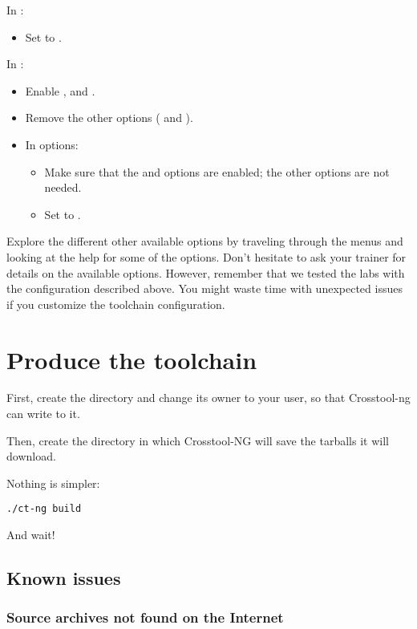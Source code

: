 In :
\begin{itemize}
\item Set  to .
\end{itemize}

In :
\begin{itemize}
\item Enable ,  and .
\item Remove the other options ( and ).
\item In  options:
  \begin{itemize}
  \item Make sure that the  and 
	options are enabled; the other options are not needed.
  \item Set  to .
  \end{itemize}
\end{itemize}

Explore the different other available options by traveling through the
menus and looking at the help for some of the options. Don't hesitate
to ask your trainer for details on the available options. However,
remember that we tested the labs with the configuration described
above. You might waste time with unexpected issues if you customize the
toolchain configuration.

\section{Produce the toolchain}

First, create the directory  and change its
owner to your user, so that Crosstool-ng can write to it.

Then, create the directory  in which Crosstool-NG
will save the tarballs it will download.

Nothing is simpler:

\begin{verbatim}
./ct-ng build
\end{verbatim}

And wait!

\subsection{Known issues}

\subsubsection{Source archives not found on the Internet}

